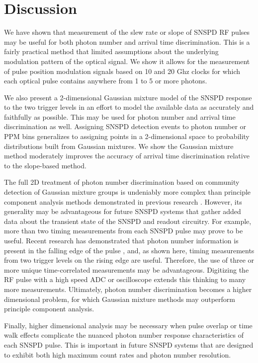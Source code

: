 \documentclass[11pt]{caltech_thesis} %
\begin{document}
\hypertarget{discussion}{%
\section{Discussion}\label{discussion}}

We have shown that measurement of the slew rate or slope of SNSPD RF pulses may be useful for both photon number and arrival time discrimination. This is a fairly practical method that limited assumptions about the underlying modulation pattern of the optical signal. We show it allows for the measurement of pulse position modulation signals based on 10 and 20 Ghz clocks for which each optical pulse contains anywhere from 1 to 5 or more photons.

We also present a 2-dimensional Gaussian mixture model of the SNSPD response to the two trigger levels in an effort to model the available data as accurately and faithfully as possible. This may be used for photon number and arrival time discrimination as well. Assigning SNSPD detection events to photon number or PPM bins generalizes to assigning points in a 2-dimensional space to probability distributions built from Gaussian mixtures. We show the Gaussian mixture method moderately improves the accuracy of arrival time discrimination relative to the slope-based method.

The full 2D treatment of photon number discrimination based on community detection of Gaussian mixture groups is undeniably more complex than principle component analysis methods demonstrated in previous research \autocite{sauer2023resolving,schapeler2023superconducting}. However, its generality may be advantageous for future SNSPD systems that gather added data about the transient state of the SNSPD and readout circuitry. For example, more than two timing measurements from each SNSPD pulse may prove to be useful. Recent research has demonstrated that photon number information is present in the falling edge of the pulse \autocite{sauer2023resolving,schapeler2023superconducting}, and, as shown here, timing measurements from two trigger levels on the rising edge are useful. Therefore, the use of three or more unique time-correlated measurements may be advantageous. Digitizing the RF pulse with a high speed ADC or oscilloscope extends this thinking to many more measurements. Ultimately, photon number discrimination becomes a higher dimensional problem, for which Gaussian mixture methods may outperform principle component analysis.

Finally, higher dimensional analysis may be necessary when pulse overlap or time walk effects \autocite{Mueller2023} complicate the nuanced photon number response characteristics of each SNSPD pulse. This is important in future SNSPD systems that are designed to exhibit both high maximum count rates \autocite{Craiciu23} and photon number resolution.
\end{document}
